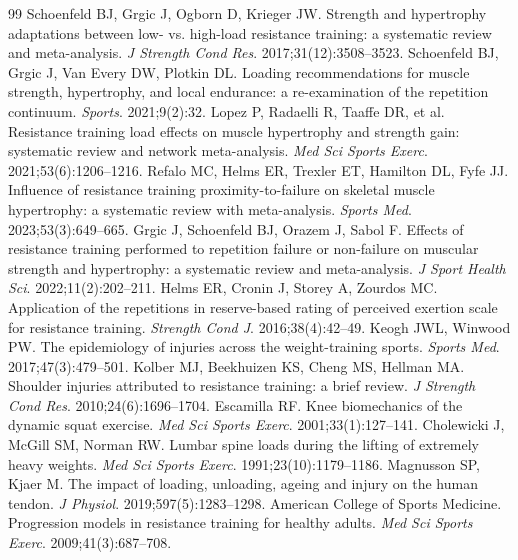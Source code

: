 \documentclass[11pt,a4paper]{article}
\begin{document}
\begin{thebibliography}{99}\footnotesize
{} Schoenfeld BJ, Grgic J, Ogborn D, Krieger JW. Strength and hypertrophy adaptations between low- vs. high-load resistance training: a systematic review and meta-analysis. \emph{J Strength Cond Res}. 2017;31(12):3508--3523.
 Schoenfeld BJ, Grgic J, Van Every DW, Plotkin DL. Loading recommendations for muscle strength, hypertrophy, and local endurance: a re-examination of the repetition continuum. \emph{Sports}. 2021;9(2):32.
 Lopez P, Radaelli R, Taaffe DR, et al. Resistance training load effects on muscle hypertrophy and strength gain: systematic review and network meta-analysis. \emph{Med Sci Sports Exerc}. 2021;53(6):1206--1216.
 Refalo MC, Helms ER, Trexler ET, Hamilton DL, Fyfe JJ. Influence of resistance training proximity-to-failure on skeletal muscle hypertrophy: a systematic review with meta-analysis. \emph{Sports Med}. 2023;53(3):649--665.
 Grgic J, Schoenfeld BJ, Orazem J, Sabol F. Effects of resistance training performed to repetition failure or non-failure on muscular strength and hypertrophy: a systematic review and meta-analysis. \emph{J Sport Health Sci}. 2022;11(2):202--211.
 Helms ER, Cronin J, Storey A, Zourdos MC. Application of the repetitions in reserve-based rating of perceived exertion scale for resistance training. \emph{Strength Cond J}. 2016;38(4):42--49.
 Keogh JWL, Winwood PW. The epidemiology of injuries across the weight-training sports. \emph{Sports Med}. 2017;47(3):479--501.
 Kolber MJ, Beekhuizen KS, Cheng MS, Hellman MA. Shoulder injuries attributed to resistance training: a brief review. \emph{J Strength Cond Res}. 2010;24(6):1696--1704.
 Escamilla RF. Knee biomechanics of the dynamic squat exercise. \emph{Med Sci Sports Exerc}. 2001;33(1):127--141.
 Cholewicki J, McGill SM, Norman RW. Lumbar spine loads during the lifting of extremely heavy weights. \emph{Med Sci Sports Exerc}. 1991;23(10):1179--1186.
 Magnusson SP, Kjaer M. The impact of loading, unloading, ageing and injury on the human tendon. \emph{J Physiol}. 2019;597(5):1283--1298.
 American College of Sports Medicine. Progression models in resistance training for healthy adults. \emph{Med Sci Sports Exerc}. 2009;41(3):687--708.
\end{thebibliography}
\end{document}

